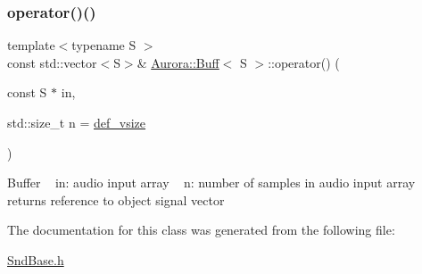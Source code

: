\subsubsection{\texorpdfstring{operator()()}{operator()()}}
{\footnotesize\ttfamily template$<$typename S $>$ \\
const std\+::vector$<$S$>$\& \hyperlink{class_aurora_1_1_buff}{Aurora\+::\+Buff}$<$ S $>$\+::operator() (\begin{DoxyParamCaption}\item[{const S $\ast$}]{in,  }\item[{std\+::size\+\_\+t}]{n = {\ttfamily \hyperlink{namespace_aurora_afaaddf667a06e7ce23c667a8b7295263}{def\+\_\+vsize}} }\end{DoxyParamCaption})\hspace{0.3cm}{\ttfamily [inline]}}

Buffer ~\newline
in\+: audio input array ~\newline
n\+: number of samples in audio input array ~\newline
returns reference to object signal vector 

The documentation for this class was generated from the following file\+:\begin{DoxyCompactItemize}
\item 
\hyperlink{_snd_base_8h}{Snd\+Base.\+h}\end{DoxyCompactItemize}
